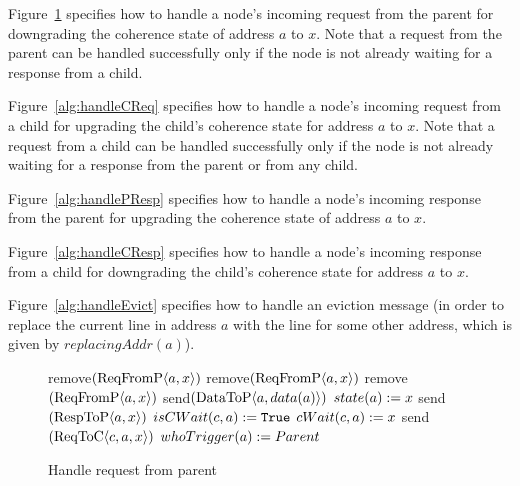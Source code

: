 Figure~\ref{alg:handlePReq} specifies how to handle a node's incoming request
from the parent for downgrading the coherence state of address $a$ to $x$. Note
that a request from the parent can be handled successfully only if the node is
not already waiting for a response from a child.

Figure~\ref{alg:handleCReq} specifies how to handle a node's incoming request
from a child for upgrading the child's coherence state for address $a$ to $x$.
Note that a request from a child can be handled successfully only if the node is
not already waiting for a response from the parent or from any child.

Figure~\ref{alg:handlePResp} specifies how to handle a node's incoming response
from the parent for upgrading the coherence state of address $a$ to $x$.

Figure~\ref{alg:handleCResp} specifies how to handle a node's incoming response
from a child for downgrading the child's coherence state for address $a$ to $x$.

Figure~\ref{alg:handleEvict} specifies how to handle an eviction message (in
order to replace the current line in address $a$ with the line for some other
address, which is given by $replacingAddr(a)$).


\begin{figure}
\begin{algorithmic}
  \State remove$(\text{ReqFromP$\langle a,x\rangle$})$
     \State remove$(\text{ReqFromP$\langle a,x\rangle$})$
     \State remove$(\text{ReqFromP$\langle a,x\rangle$})$
        \State send$(\text{DataToP$\langle a,data(a)\rangle$})$
     \EndIf
     \State $state(a) := x$
     \State send$(\text{RespToP$\langle a,x\rangle$})$
  \Else
           \State $isCWait(c, a) := \texttt{True}$
           \State $cWait(c, a) := x$
           \State send$(\text{ReqToC$\langle c,a,x\rangle$})$
        \EndIf
     \EndFor
     \State \textcolor{trig-color}{$whoTrigger(a) := Parent$}
  \EndIf
\EndIf
\EndRule
\end{algorithmic}
\caption{Handle request from parent}
\label{alg:handlePReq}
\end{figure}

